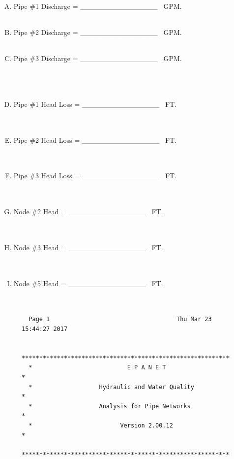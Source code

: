 \documentclass[11pt]{article}
\begin{document}
\begin{enumerate}
\begin{enumerate}[a)]
\begin{enumerate}[A)]
\item Pipe \#1 Discharge = \_\_\_\_\_\_\_\_\_\_\_\_\_\_\_~ GPM.\\~\\
\item Pipe \#2 Discharge = \_\_\_\_\_\_\_\_\_\_\_\_\_\_\_~ GPM.\\~\\
\item Pipe \#3 Discharge = \_\_\_\_\_\_\_\_\_\_\_\_\_\_\_~ GPM.\\~\\
\newpage ~\\~\\
\item Pipe \#1 Head Loss = \_\_\_\_\_\_\_\_\_\_\_\_\_\_\_~ FT.\\~\\~\\
\item Pipe \#2 Head Loss = \_\_\_\_\_\_\_\_\_\_\_\_\_\_\_~ FT.\\~\\~\\
\item Pipe \#3 Head Loss = \_\_\_\_\_\_\_\_\_\_\_\_\_\_\_~ FT. \\~\\~\\
\item Node \#2 Head = \_\_\_\_\_\_\_\_\_\_\_\_\_\_\_~ FT.\\~\\~\\
\item Node \#3 Head = \_\_\_\_\_\_\_\_\_\_\_\_\_\_\_~ FT.\\~\\~\\
\item Node \#5 Head = \_\_\_\_\_\_\_\_\_\_\_\_\_\_\_~ FT.\\~\\~\\
\end{enumerate}
\end{enumerate} 


\begin{figure}[ht!] %
\centering
\begin{verbatim}
  Page 1                                    Thu Mar 23 15:44:27 2017

  ******************************************************************
  *                           E P A N E T                          *
  *                   Hydraulic and Water Quality                  *
  *                   Analysis for Pipe Networks                   *
  *                         Version 2.00.12                        *
  ******************************************************************
  

\end{verbatim}
\end{figure}
\end{enumerate}
\end{document}
